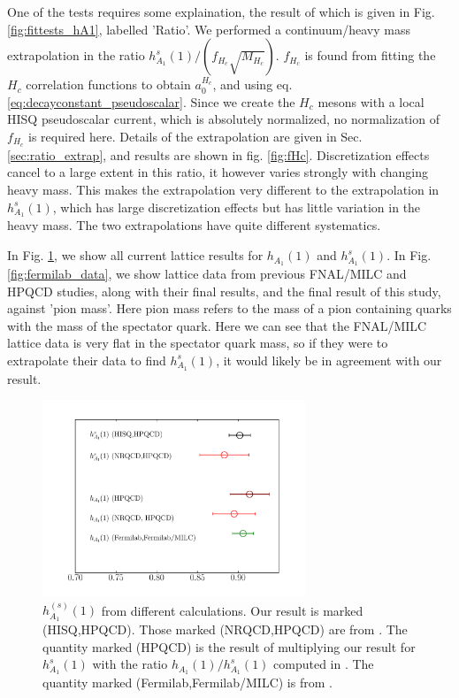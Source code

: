 One of the tests requires some explaination, the result of which is given in Fig. \ref{fig:fittests_hA1}, labelled 'Ratio'. We performed a continuum/heavy mass extrapolation in the ratio $h_{A_1}^s(1)/(f_{H_c}\sqrt{M_{H_c}})$. $f_{H_c}$ is found from fitting the $H_c$ correlation functions to obtain $a_0^{H_c}$, and using eq. \eqref{eq:decayconstant_pseudoscalar}. Since we create the $H_c$ mesons with a local HISQ pseudoscalar current, which is absolutely normalized, no normalization of $f_{H_c}$ is required here. Details of the extrapolation are given in Sec. \ref{sec:ratio_extrap}, and results are shown in fig. \ref{fig:fHc}. Discretization effects cancel to a large extent in this ratio, it however varies strongly with changing heavy mass. This makes the extrapolation very different to the extrapolation in $h_{A_1}^s(1)$, which has large discretization effects but has little variation in the heavy mass. The two extrapolations have quite different systematics.

In Fig. \ref{fig:comparison_BsDsstar}, we show all current lattice results for $h_{A_1}(1)$ and $h_{A_1}^s(1)$. In Fig. \ref{fig:fermilab_data}, we show lattice data from previous FNAL/MILC and HPQCD studies, along with their final results, and the final result of this study, against 'pion mass'. Here pion mass refers to the mass of a pion containing quarks with the mass of the spectator quark. Here we can see that the FNAL/MILC lattice data is very flat in the spectator quark mass, so if they were to extrapolate their data to find $h^s_{A_1}(1)$, it would likely be in agreement with our result.

\begin{figure}[htb!]
  \begin{center}
  \hspace{-20pt}
  \includegraphics[width=0.7\textwidth]{images/BsDsstar/comparisons.pdf}
  \caption{ $h_{A_1}^{(s)}(1)$ from different calculations. Our result is marked (HISQ,HPQCD). Those marked (NRQCD,HPQCD) are from \cite{Harrison:2017fmw}. The quantity marked (HPQCD) is the result of multiplying our result for $h^s_{A_1}(1)$ with the ratio $h_{A_1}(1)/h^s_{A_1}(1)$ computed in \cite{Harrison:2017fmw}. The quantity marked (Fermilab,Fermilab/MILC) is from \cite{Bailey:2014tva}. \label{fig:comparison_BsDsstar}}
  \end{center}
\end{figure}

